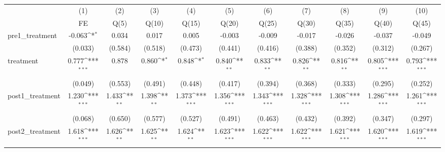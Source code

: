 {
\def\sym#1{\ifmmode^{#1}\else\(^{#1}\)\fi}
\begin{tabular}{l*{10}{c}}
\toprule
            &\multicolumn{1}{c}{(1)}&\multicolumn{1}{c}{(2)}&\multicolumn{1}{c}{(3)}&\multicolumn{1}{c}{(4)}&\multicolumn{1}{c}{(5)}&\multicolumn{1}{c}{(6)}&\multicolumn{1}{c}{(7)}&\multicolumn{1}{c}{(8)}&\multicolumn{1}{c}{(9)}&\multicolumn{1}{c}{(10)}\\
            &\multicolumn{1}{c}{FE}&\multicolumn{1}{c}{Q(5)}&\multicolumn{1}{c}{Q(10)}&\multicolumn{1}{c}{Q(15)}&\multicolumn{1}{c}{Q(20)}&\multicolumn{1}{c}{Q(25)}&\multicolumn{1}{c}{Q(30)}&\multicolumn{1}{c}{Q(35)}&\multicolumn{1}{c}{Q(40)}&\multicolumn{1}{c}{Q(45)}\\
\midrule
pre1\_treatment&      -0.063\sym{*}  &       0.034         &       0.017         &       0.005         &      -0.003         &      -0.009         &      -0.017         &      -0.026         &      -0.037         &      -0.049         \\
            &     (0.033)         &     (0.584)         &     (0.518)         &     (0.473)         &     (0.441)         &     (0.416)         &     (0.388)         &     (0.352)         &     (0.312)         &     (0.267)         \\
\addlinespace
treatment   &       0.777\sym{***}&       0.878         &       0.860\sym{*}  &       0.848\sym{*}  &       0.840\sym{**} &       0.833\sym{**} &       0.826\sym{**} &       0.816\sym{**} &       0.805\sym{***}&       0.793\sym{***}\\
            &     (0.049)         &     (0.553)         &     (0.491)         &     (0.448)         &     (0.417)         &     (0.394)         &     (0.368)         &     (0.333)         &     (0.295)         &     (0.252)         \\
\addlinespace
post1\_treatment&       1.230\sym{***}&       1.433\sym{**} &       1.398\sym{**} &       1.373\sym{***}&       1.356\sym{***}&       1.343\sym{***}&       1.328\sym{***}&       1.308\sym{***}&       1.286\sym{***}&       1.261\sym{***}\\
            &     (0.068)         &     (0.650)         &     (0.577)         &     (0.527)         &     (0.491)         &     (0.463)         &     (0.432)         &     (0.392)         &     (0.347)         &     (0.297)         \\
\addlinespace
post2\_treatment&       1.618\sym{***}&       1.626\sym{**} &       1.625\sym{**} &       1.624\sym{**} &       1.623\sym{***}&       1.622\sym{***}&       1.622\sym{***}&       1.621\sym{***}&       1.620\sym{***}&       1.619\sym{***}\\

\end{tabular}}
